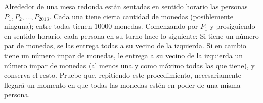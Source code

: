 Alrededor de una mesa redonda están sentadas en sentido horario las personas $P_1,P_2,\ldots,P_{2013}$. Cada una tiene cierta cantidad de monedas (posiblemente ninguna); entre todas tienen $10000$ monedas. Comenzando por $P_1$ y prosiguiendo en sentido horario, cada persona en su turno hace lo siguiente: Si tiene un número par de monedas, se las entrega todas a su vecino de la izquierda. Si en cambio tiene un número impar de monedas, le entrega a su vecino de la izquierda un número impar de monedas (al menos una y como máximo todas las que tiene), y conserva el resto.
Pruebe que, repitiendo este procedimiento, necesariamente llegará un momento en que todas las monedas estén en poder de una misma persona.

